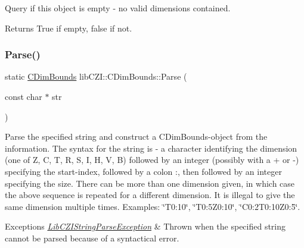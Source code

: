 Query if this object is empty -\/ no valid dimensions contained.

\begin{DoxyReturn}{Returns}
True if empty, false if not. 
\end{DoxyReturn}
\mbox{\label{classlib_c_z_i_1_1_c_dim_bounds_a10a59c07b8f3cb2ec8d8a082e9167bfb}} 
\subsubsection{\texorpdfstring{Parse()}{Parse()}}
{\footnotesize\ttfamily static \hyperlink{classlib_c_z_i_1_1_c_dim_bounds}{C\+Dim\+Bounds} lib\+C\+Z\+I\+::\+C\+Dim\+Bounds\+::\+Parse (\begin{DoxyParamCaption}\item[{const char $\ast$}]{str }\end{DoxyParamCaption})\hspace{0.3cm}{\ttfamily [static]}}

Parse the specified string and construct a C\+Dim\+Bounds-\/object from the information. The syntax for the string is -\/ a character identifying the dimension (one of \textquotesingle{}Z\textquotesingle{}, \textquotesingle{}C\textquotesingle{}, \textquotesingle{}T\textquotesingle{}, \textquotesingle{}R\textquotesingle{}, \textquotesingle{}S\textquotesingle{}, \textquotesingle{}I\textquotesingle{}, \textquotesingle{}H\textquotesingle{}, \textquotesingle{}V\textquotesingle{}, \textquotesingle{}B\textquotesingle{}) followed by an integer (possibly with a + or -\/) specifying the start-\/index, followed by a colon \textquotesingle{}\+:\textquotesingle{}, then followed by an integer specifying the size. There can be more than one dimension given, in which case the above sequence is repeated for a different dimension. It is illegal to give the same dimension multiple times. Examples\+: \char`\"{}\+T0\+:10\char`\"{}, \char`\"{}\+T0\+:5\+Z0\+:10\char`\"{}, \char`\"{}\+C0\+:2\+T0\+:10\+Z0\+:5\char`\"{}.


\begin{DoxyExceptions}{Exceptions}
{\em \hyperlink{classlib_c_z_i_1_1_lib_c_z_i_string_parse_exception}{Lib\+C\+Z\+I\+String\+Parse\+Exception}} & Thrown when the specified string cannot be parsed because of a syntactical error.\\
\hline
\end{DoxyExceptions}

